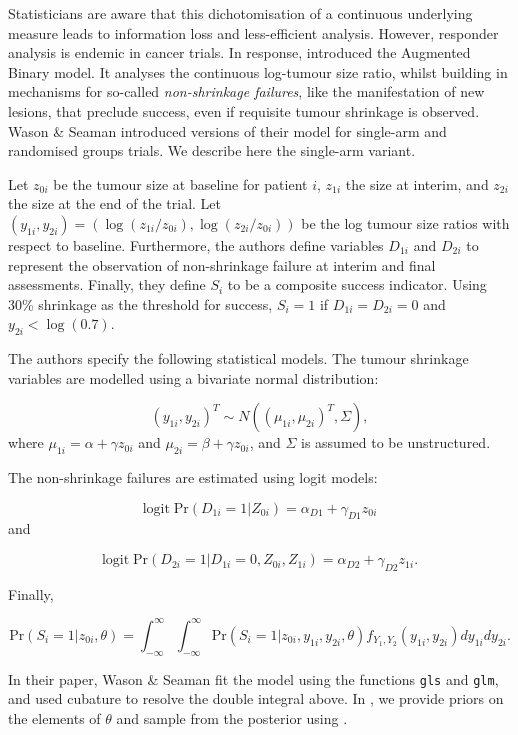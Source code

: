 \documentclass[article]{jss}
\begin{document}
Statisticians are aware that this dichotomisation of a continuous
underlying measure leads to information loss and less-efficient
analysis. However, responder analysis is endemic in cancer trials. In
response, \citet{Wason2013} introduced the Augmented Binary model. It
analyses the continuous log-tumour size ratio, whilst building in
mechanisms for so-called \textit{non-shrinkage failures}, like the
manifestation of new lesions, that preclude success, even if requisite
tumour shrinkage is observed. Wason \& Seaman introduced versions of
their model for single-arm and randomised groups trials. We describe
here the single-arm variant.

Let \(z_{0i}\) be the tumour size at baseline for patient \(i\),
\(z_{1i}\) the size at interim, and \(z_{2i}\) the size at the end of
the trial. Let
\((y_{1i}, y_{2i}) = (\log{(z_{1i} / z_{0i})}, \log{(z_{2i} / z_{0i})})\)
be the log tumour size ratios with respect to baseline. Furthermore, the
authors define variables \(D_{1i}\) and \(D_{2i}\) to represent the
observation of non-shrinkage failure at interim and final assessments.
Finally, they define \(S_i\) to be a composite success indicator. Using
30\% shrinkage as the threshold for success, \(S_i = 1\) if
\(D_{1i} = D_{2i} = 0\) and \(y_{2i} < \log{(0.7)}\).

The authors specify the following statistical models. The tumour
shrinkage variables are modelled using a bivariate normal distribution:

\[ (y_{1i}, y_{2i})^T \sim N\left( (\mu_{1i}, \mu_{2i})^T, \Sigma\right),\]
where \(\mu_{1i} = \alpha + \gamma z_{0i}\) and
\(\mu_{2i} = \beta + \gamma z_{0i}\), and \(\Sigma\) is assumed to be
unstructured.

The non-shrinkage failures are estimated using logit models:

\[ \text{logit} \; \text{Pr}(D_{1i} = 1 | Z_{0i}) = \alpha_{D1} + \gamma_{D1} z_{0i} \]
and

\[ \text{logit} \; \text{Pr}(D_{2i} = 1 | D_{1i} = 0, Z_{0i}, Z_{1i}) = \alpha_{D2} + \gamma_{D2} z_{1i} .\]

Finally,

\[ \text{Pr}(S_i = 1 | z_{0i}, \theta) = \int_{-\infty}^\infty \int_{-\infty}^\infty \text{Pr}(S_i = 1 | z_{0i}, y_{1i}, y_{2i}, \theta) f_{Y_1, Y_2}(y_{1i}, y_{2i}) dy_{1i} dy_{2i} .\]

In their paper, Wason \& Seaman fit the model using the 
functions \texttt{gls} and \texttt{glm}, and used cubature to resolve
the double integral above. In , we provide priors on the
elements of \(\theta\) and sample from the posterior using
.
\end{document}
